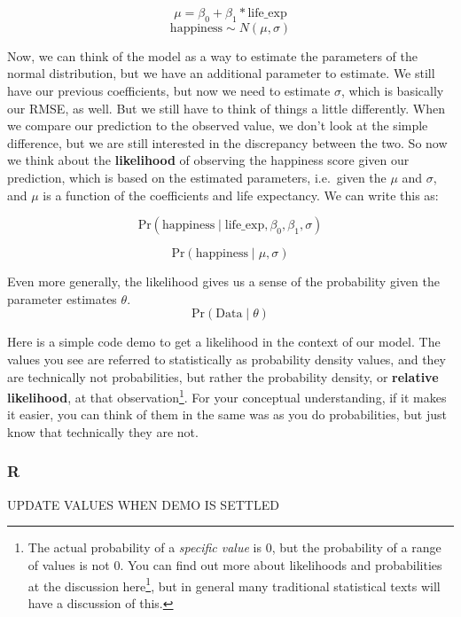 \documentclass[
  letterpaper,
]{krantz}
\DeclareRobustCommand{\href}[2]{#2\footnote{\url{#1}}}
\begin{document}
\[
\mu = \beta_0 + \beta_1 * \textrm{life\_exp}
\] \[
\textrm{happiness} \sim N(\mu, \sigma)
\]

Now, we can think of the model as a way to estimate the parameters of
the normal distribution, but we have an additional parameter to
estimate. We still have our previous coefficients, but now we need to
estimate \(\sigma\), which is basically our RMSE, as well. But we still
have to think of things a little differently. When we compare our
prediction to the observed value, we don't look at the simple
difference, but we are still interested in the discrepancy between the
two. So now we think about the \textbf{likelihood} of observing the
happiness score given our prediction, which is based on the estimated
parameters, i.e.~given the \(\mu\) and \(\sigma\), and \(\mu\) is a
function of the coefficients and life expectancy. We can write this as:

\[
\textrm{Pr}(\textrm{happiness} \mid \textrm{life\_exp}, \beta_0, \beta_1, \sigma)
\]

\[
\textrm{Pr}(\textrm{happiness} \mid \mu, \sigma)
\]

Even more generally, the likelihood gives us a sense of the probability
given the parameter estimates \(\theta\). \[
\textrm{Pr}(\textrm{Data} \mid \theta)
\]

Here is a simple code demo to get a likelihood in the context of our
model. The values you see are referred to statistically as probability
density values, and they are technically not probabilities, but rather
the probability density, or \textbf{relative likelihood}, at that
observation\footnote{The actual probability of a \emph{specific value}
  is 0, but the probability of a range of values is not 0. You can find
  out more about likelihoods and probabilities at the discussion
  \href{https://stats.stackexchange.com/questions/2641/what-is-the-difference-between-likelihood-and-probability}{here},
  but in general many traditional statistical texts will have a
  discussion of this.}. For your conceptual understanding, if it makes
it easier, you can think of them in the same was as you do
probabilities, but just know that technically they are not.

\subsubsection{R}

UPDATE VALUES WHEN DEMO IS SETTLED
\end{document}
